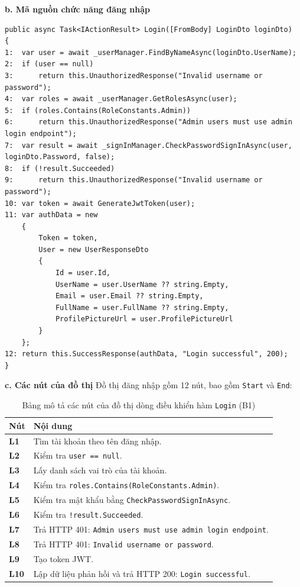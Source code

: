 \documentclass[11pt,a4paper]{article}
\begin{document}
\noindent\textbf{b. Mã nguồn chức năng đăng nhập}
\begin{lstlisting}[language={[Sharp]C}]
public async Task<IActionResult> Login([FromBody] LoginDto loginDto)
{
1:  var user = await _userManager.FindByNameAsync(loginDto.UserName);
2:  if (user == null)
3:      return this.UnauthorizedResponse("Invalid username or password");
4:  var roles = await _userManager.GetRolesAsync(user);
5:  if (roles.Contains(RoleConstants.Admin))
6:      return this.UnauthorizedResponse("Admin users must use admin login endpoint");
7:  var result = await _signInManager.CheckPasswordSignInAsync(user, loginDto.Password, false);
8:  if (!result.Succeeded)
9:      return this.UnauthorizedResponse("Invalid username or password");
10: var token = await GenerateJwtToken(user);
11: var authData = new
    {
        Token = token,
        User = new UserResponseDto
        {
            Id = user.Id,
            UserName = user.UserName ?? string.Empty,
            Email = user.Email ?? string.Empty,
            FullName = user.FullName ?? string.Empty,
            ProfilePictureUrl = user.ProfilePictureUrl
        }
    };
12: return this.SuccessResponse(authData, "Login successful", 200);
}
\end{lstlisting}

\noindent\textbf{c. Các nút của đồ thị}
Đồ thị đăng nhập gồm 12 nút, bao gồm \texttt{Start} và \texttt{End}:
\begin{table}[H]
\centering
\small
\begin{tabularx}{\textwidth}{|C{1.8cm}|X|}
\hline
{}
\textbf{Nút} & \textbf{Nội dung} \tabularnewline
\hline
\textbf{L1} & Tìm tài khoản theo tên đăng nhập. \\ \hline
\textbf{L2} & Kiểm tra \texttt{user == null}. \\ \hline
\textbf{L3} & Lấy danh sách vai trò của tài khoản. \\ \hline
\textbf{L4} & Kiểm tra \texttt{roles.Contains(RoleConstants.Admin)}. \\ \hline
\textbf{L5} & Kiểm tra mật khẩu bằng \texttt{CheckPasswordSignInAsync}. \\ \hline
\textbf{L6} & Kiểm tra \texttt{!result.Succeeded}. \\ \hline
\textbf{L7} & Trả HTTP 401: \texttt{Admin users must use admin login endpoint}. \\ \hline
\textbf{L8} & Trả HTTP 401: \texttt{Invalid username or password}. \\ \hline
\textbf{L9} & Tạo token JWT. \\ \hline
\textbf{L10} & Lập dữ liệu phản hồi và trả HTTP 200: \texttt{Login successful}. \\ \hline
\end{tabularx}
\caption{Bảng mô tả các nút của đồ thị dòng điều khiển hàm \texttt{Login} (B1)}
\end{table}
\end{document}
